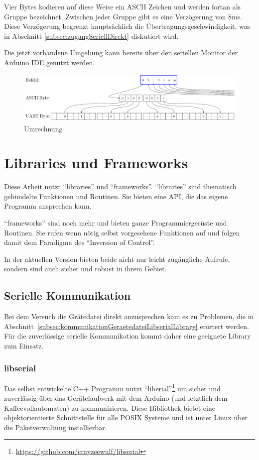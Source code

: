 Vier Bytes kodieren auf diese Weise ein ASCII Zeichen und werden fortan als Gruppe bezeichnet.
Zwischen jeder Gruppe gibt es eine Verzögerung von 8ms.
Diese Verzögerung begrenzt hauptsächlich die Übertragungsgeschwindigkeit, was in Abschnitt \ref{subsec:zugangSeriellDirekt} diskutiert wird.

Die jetzt vorhandene Umgebung kann bereits über den seriellen Monitor der Arduino IDE genutzt werden.

\begin{figure}
  \begin{center}
    \includegraphics[scale=0.6]{images/UART-Bytes}
    \caption{Umrechnung }
    \label{fig:uart}
  \end{center}
\end{figure}



\section{Libraries und Frameworks}
Diese Arbeit nutzt "`libraries"' und "`frameworks"'.
"`libraries"' sind thematisch gebündelte Funktionen und Routinen. Sie bieten eine \ac{API}, die das eigene Programm ansprechen kann.

"`frameworks"' sind noch mehr und bieten ganze Programmiergerüste und Routinen. Sie rufen wenn nötig selbst vorgesehene Funktionen auf und folgen damit dem Paradigma des "`Inversion of Control"'.

In der aktuellen Version bieten beide nicht nur leicht zugängliche Aufrufe, sondern sind auch sicher und robust in ihrem Gebiet.

\subsection{Serielle Kommunikation}
Bei dem Versuch die Grätedatei direkt anzusprechen kam es zu Problemen, die in Abschnitt~\ref{subsec:kommunikationGeraetedateiLibserialLibrary} erörtert werden. Für die zuverlässige serielle Kommunikation kommt daher eine geeignete Library zum Einsatz.

\subsubsection{libserial}
Das selbst entwickelte C++ Programm nutzt "`liberial"'\footnote{\url{https://github.com/crayzeewulf/libserial}} um sicher und zuverlässig über das Gerätelaufwerk mit dem Arduino (und letztlich dem Kaffeevollautomaten) zu kommunizieren.
Diese Bibliothek bietet eine objektorientierte Schnittstelle für alle \ac{POSIX} Systeme und ist unter Linux über die Paketverwaltung installierbar.

